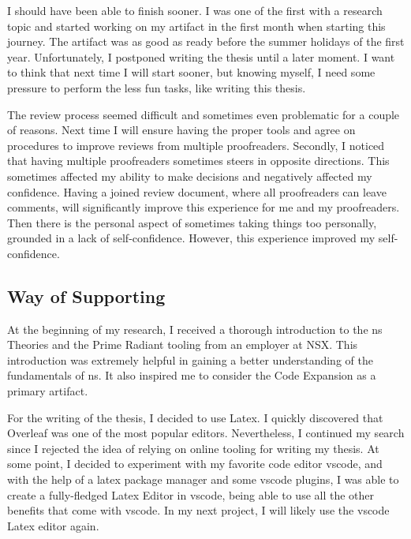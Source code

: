 I should have been able to finish sooner. I was one of the first with a research topic and
started working on my artifact in the first month when starting this journey. The artifact
was as good as ready before the summer holidays of the first year. Unfortunately, I
postponed writing the thesis until a later moment. I want to think that next time I will
start sooner, but knowing myself, I need some pressure to perform the less fun tasks, like
writing this thesis.

The review process seemed difficult and sometimes even problematic for a couple of
reasons. Next time I will ensure having the proper tools and agree on procedures to
improve reviews from multiple proofreaders. Secondly, I noticed that having multiple
proofreaders sometimes steers in opposite directions. This sometimes affected my ability
to make decisions and negatively affected my confidence. Having a joined review document,
where all proofreaders can leave comments, will significantly improve this experience for
me and my proofreaders. Then there is the personal aspect of sometimes taking things too
personally, grounded in a lack of self-confidence. However, this experience improved my
self-confidence. 

\subsection{Way of Supporting}

At the beginning of my research, I received a thorough introduction to the \gls{ns}
Theories and the Prime Radiant tooling from an employer at NSX. This introduction was
extremely helpful in gaining a better understanding of the fundamentals of \gls{ns}. It
also inspired me to consider the Code Expansion as a primary artifact. 

For the writing of the thesis, I decided to use Latex. I quickly discovered that Overleaf
was one of the most popular editors. Nevertheless, I continued my search since I rejected
the idea of relying on online tooling for writing my thesis. At some point, I decided to
experiment with my favorite code editor \gls{vscode}, and with the help of a latex package
manager and some \gls{vscode} plugins, I was able to create a fully-fledged Latex Editor
in \gls{vscode}, being able to use all the other benefits that come with \gls{vscode}. In
my next project, I will likely use the \gls{vscode} Latex editor again.
